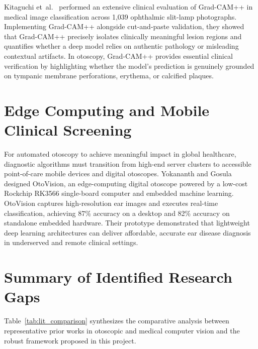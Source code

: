 \documentclass[12pt,a4paper]{report}
\renewcommand{\textbf}[1]{#1}
\begin{document}
Kitaguchi et~al.~\cite{ref_kitaguchi2026_gradcampp} performed an extensive clinical evaluation of Grad-CAM++ in medical image classification across 1,039 ophthalmic slit-lamp photographs. Implementing Grad-CAM++ alongside cut-and-paste validation, they showed that Grad-CAM++ precisely isolates clinically meaningful lesion regions and quantifies whether a deep model relies on authentic pathology or misleading contextual artifacts. In otoscopy, Grad-CAM++ provides essential clinical verification by highlighting whether the model's prediction is genuinely grounded on tympanic membrane perforations, erythema, or calcified plaques.

\section{Edge Computing and Mobile Clinical Screening}
For automated otoscopy to achieve meaningful impact in global healthcare, diagnostic algorithms must transition from high-end server clusters to accessible point-of-care mobile devices and digital otoscopes. Yokananth and Gosula~\cite{ref_yokananth2025_otovision} designed \textbf{OtoVision}, an edge-computing digital otoscope powered by a low-cost Rockchip RK3566 single-board computer and embedded machine learning. OtoVision captures high-resolution ear images and executes real-time classification, achieving 87\% accuracy on a desktop and 82\% accuracy on standalone embedded hardware. Their prototype demonstrated that lightweight deep learning architectures can deliver affordable, accurate ear disease diagnosis in underserved and remote clinical settings.

\section{Summary of Identified Research Gaps}
Table~\ref{tab:lit_comparison} synthesizes the comparative analysis between representative prior works in otoscopic and medical computer vision and the robust framework proposed in this project.
\end{document}
